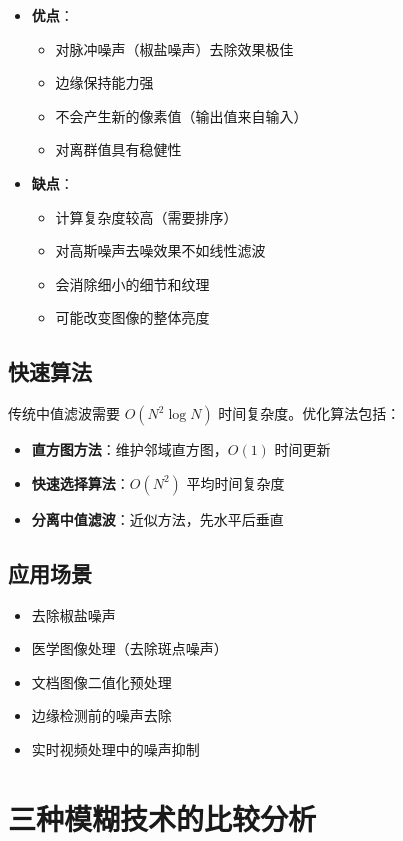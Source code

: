 \documentclass{article}
\begin{document}
\begin{itemize}
    \item \textbf{优点}：
    \begin{itemize}
        \item 对脉冲噪声（椒盐噪声）去除效果极佳
        \item 边缘保持能力强
        \item 不会产生新的像素值（输出值来自输入）
        \item 对离群值具有稳健性
    \end{itemize}

    \item \textbf{缺点}：
    \begin{itemize}
        \item 计算复杂度较高（需要排序）
        \item 对高斯噪声去噪效果不如线性滤波
        \item 会消除细小的细节和纹理
        \item 可能改变图像的整体亮度
    \end{itemize}
\end{itemize}

\subsection{快速算法}
传统中值滤波需要 $O(N^2 \log N)$ 时间复杂度。优化算法包括：
\begin{itemize}
    \item \textbf{直方图方法}：维护邻域直方图，$O(1)$ 时间更新
    \item \textbf{快速选择算法}：$O(N^2)$ 平均时间复杂度
    \item \textbf{分离中值滤波}：近似方法，先水平后垂直
\end{itemize}

\subsection{应用场景}
\begin{itemize}
    \item 去除椒盐噪声
    \item 医学图像处理（去除斑点噪声）
    \item 文档图像二值化预处理
    \item 边缘检测前的噪声去除
    \item 实时视频处理中的噪声抑制
\end{itemize}

\section{三种模糊技术的比较分析}
\end{document}
